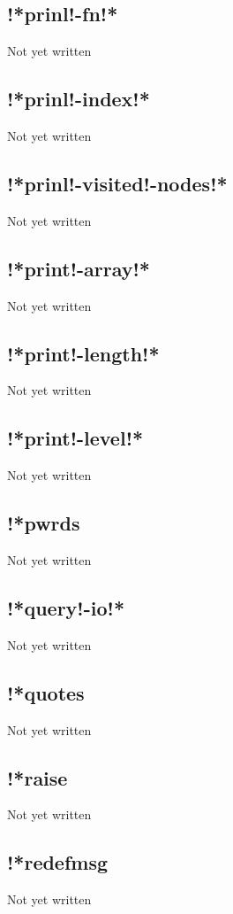 \documentclass[a4paper,11pt]{article}
\begin{document}
\subsection{\ttfamily !*prinl!-fn!*}
Not yet written

\subsection{\ttfamily !*prinl!-index!*}
Not yet written

\subsection{\ttfamily !*prinl!-visited!-nodes!*}
Not yet written

\subsection{\ttfamily !*print!-array!*}
Not yet written

\subsection{\ttfamily !*print!-length!*}
Not yet written

\subsection{\ttfamily !*print!-level!*}
Not yet written

\subsection{\ttfamily !*pwrds}
Not yet written

\subsection{\ttfamily !*query!-io!*}
Not yet written

\subsection{\ttfamily !*quotes}
Not yet written

\subsection{\ttfamily !*raise}
Not yet written

\subsection{\ttfamily !*redefmsg}
Not yet written
\end{document}
